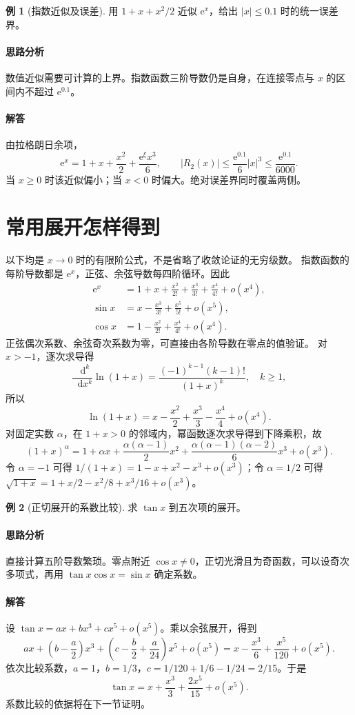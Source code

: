 \documentclass[UTF8,fontset=fandol,12pt,oneside,openany]{ctexrep}
\newcommand{\dd}{\mathop{}\!\mathrm d}
\newcommand{\ee}{\mathrm e}
\theoremstyle{definition}
\newtheorem{example}{例}[chapter]
\begin{document}
\begin{example}[指数近似及误差]用 $1+x+x^2/2$ 近似 $\ee^x$，给出 $|x|\le0.1$ 时的统一误差界。\end{example}
\paragraph{思路分析}数值近似需要可计算的上界。指数函数三阶导数仍是自身，在连接零点与 $x$ 的区间内不超过 $\ee^{0.1}$。
\paragraph{解答}由拉格朗日余项，
\[
\ee^x=1+x+\frac{x^2}{2}+\frac{\ee^\xi x^3}{6},\qquad
|R_2(x)|\le\frac{\ee^{0.1}}6|x|^3\le\frac{\ee^{0.1}}{6000}.
\]
当 $x\ge0$ 时该近似偏小；当 $x<0$ 时偏大。绝对误差界同时覆盖两侧。

\section{常用展开怎样得到}
以下均是 $x\to0$ 时的有限阶公式，不是省略了收敛论证的无穷级数。
指数函数的每阶导数都是 $\ee^x$，正弦、余弦导数每四阶循环。因此
\begin{align*}
\ee^x&=1+x+\frac{x^2}{2!}+\frac{x^3}{3!}+\frac{x^4}{4!}+o(x^4),\\
\sin x&=x-\frac{x^3}{3!}+\frac{x^5}{5!}+o(x^5),\\
\cos x&=1-\frac{x^2}{2!}+\frac{x^4}{4!}+o(x^4).
\end{align*}
正弦偶次系数、余弦奇次系数为零，可直接由各阶导数在零点的值验证。
对 $x>-1$，逐次求导得
\[
\frac{\dd^k}{\dd x^k}\ln(1+x)=\frac{(-1)^{k-1}(k-1)!}{(1+x)^k},\quad k\ge1,
\]
所以
\[
\ln(1+x)=x-\frac{x^2}{2}+\frac{x^3}{3}-\frac{x^4}{4}+o(x^4).
\]
对固定实数 $\alpha$，在 $1+x>0$ 的邻域内，幂函数逐次求导得到下降乘积，故
\[
(1+x)^\alpha=1+\alpha x+\frac{\alpha(\alpha-1)}2x^2
+\frac{\alpha(\alpha-1)(\alpha-2)}6x^3+o(x^3).
\]
令 $\alpha=-1$ 可得 $1/(1+x)=1-x+x^2-x^3+o(x^3)$；令 $\alpha=1/2$ 可得 $\sqrt{1+x}=1+x/2-x^2/8+x^3/16+o(x^3)$。

\begin{example}[正切展开的系数比较]求 $\tan x$ 到五次项的展开。\end{example}
\paragraph{思路分析}直接计算五阶导数繁琐。零点附近 $\cos x\ne0$，正切光滑且为奇函数，可以设奇次多项式，再用 $\tan x\cos x=\sin x$ 确定系数。
\paragraph{解答}设 $\tan x=ax+bx^3+cx^5+o(x^5)$。乘以余弦展开，得到
\[
ax+\left(b-\frac a2\right)x^3
+\left(c-\frac b2+\frac a{24}\right)x^5+o(x^5)
=x-\frac{x^3}6+\frac{x^5}{120}+o(x^5).
\]
依次比较系数，$a=1$，$b=1/3$，$c=1/120+1/6-1/24=2/15$。于是
\[
\tan x=x+\frac{x^3}3+\frac{2x^5}{15}+o(x^5).
\]
系数比较的依据将在下一节证明。
\end{document}

